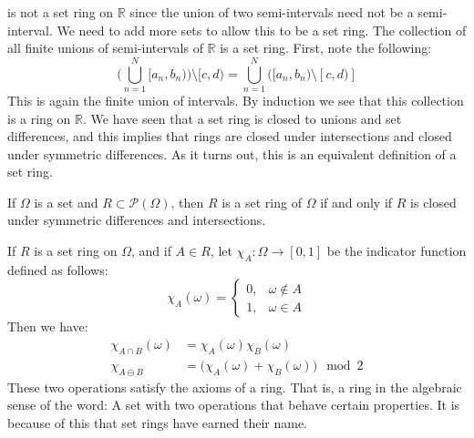     is not a set ring on $\mathbb{R}$ since the union
    of two semi-intervals need not be a semi-interval.
    We need to add more sets to allow this to be a
    set ring. The collection of all finite unions of
    semi-intervals of $\mathbb{R}$ is a set ring.
    First, note the following:
    \begin{equation}
        \Big(\bigcup_{n=1}^{N}[a_{n},b_{n})\Big)
        \setminus[c,d)=\bigcup_{n=1}^{N}
        \Big([a_{n},b_{n})\setminus[c,d)]
    \end{equation}
    This is again the finite union of intervals. By
    induction we see that this collection is a ring on
    $\mathbb{R}$. We have seen that a set ring is
    closed to unions and set differences, and this
    implies that rings are closed under intersections and
    closed under symmetric differences. As it turns out,
    this is an equivalent definition of a set ring.
    \begin{theorem}
        If $\Omega$ is a set and
        $R\subset\mathcal{P}(\Omega)$, then $R$ is
        a set ring of $\Omega$ if and only if $R$ is
        closed under symmetric differences and
        intersections.
    \end{theorem}
    If $R$ is a set ring on $\Omega$, and if
    $A\in{R}$, let $\chi_{A}:\Omega\rightarrow[0,1]$ be
    the indicator function defined as follows:
    \begin{equation}
        \chi_{A}(\omega)=
        \begin{cases}
            0,&\omega\notin{A}\\
            1,&\omega\in{A}
        \end{cases}
    \end{equation}
    Then we have:
    \begin{align}
        \chi_{A\cap{B}}(\omega)
        &=\chi_{A}(\omega)\chi_{B}(\omega)\\
        \chi_{A\ominus{B}}&=
        \big(\chi_{A}(\omega)+\chi_{B}(\omega)\big)
        \mod{2}
    \end{align}
    These two operations satisfy the axioms of a ring.
    That is, a ring in the algebraic sense of the word:
    A set with two operations that behave certain
    properties. It is because of this that set rings
    have earned their name.